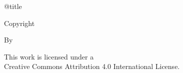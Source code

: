 \begin{center}
  \csname @title\endcsname

  \vspace{5\baselineskip}
  Copyright \MyYear
  \par\vspace{\baselineskip} By
  \par\vspace{\baselineskip} \MyAuthor

  \vspace{5\baselineskip}%
  This work is licensed under a \\
  Creative Commons Attribution 4.0 International License.
\end{center}

\clearpage
